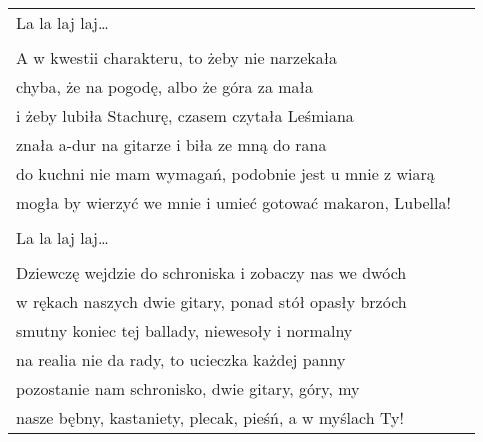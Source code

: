 \documentclass[a5paper]{article}
\begin{document}
\begin{tabular}{@{}p{9.5cm}p{3cm}@{}}
\hspace{1cm}La la laj laj… \\ \\

A w kwestii charakteru, to żeby nie narzekała \\
chyba, że na pogodę, albo że góra za mała \\
i żeby lubiła Stachurę, czasem czytała Leśmiana \\
znała a-dur na gitarze i biła ze mną do rana \\
do kuchni nie mam wymagań, podobnie jest u mnie z wiarą \\
mogła by wierzyć we mnie i umieć gotować makaron, Lubella! \\ \\

\hspace{1cm}La la laj laj… \\ \\

Dziewczę wejdzie do schroniska i zobaczy nas we dwóch \\
w rękach naszych dwie gitary, ponad stół opasły brzóch \\
smutny koniec tej ballady, niewesoły i normalny \\
na realia nie da rady, to ucieczka każdej panny \\
pozostanie nam schronisko, dwie gitary, góry, my \\
nasze bębny, kastaniety, plecak, pieśń, a w myślach Ty!
\end{tabular}
\end{document}
